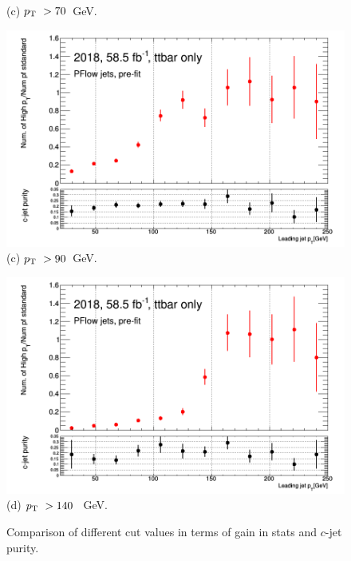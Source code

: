 \documentclass[letterpaper,12pt]{article}
\begin{document}
\begin{figure}[!h]
\begin{minipage}[b]{.45\textwidth}
\footnotesize (c) $p_{\mathrm T}\ > 70$~GeV.
\end{minipage}\hfill
\begin{minipage}[b]{.45\textwidth}
\centering
\includegraphics[width=1\textwidth]{stat_gains/statsgain_90GeV.png}
\footnotesize (c) $\pt\ > 90$~GeV.
\end{minipage}\hfill
\centering
\begin{minipage}[b]{.45\textwidth}
\centering
\includegraphics[width=1\textwidth]{stat_gains/statsgain_140GeV.png}
\footnotesize (d) $\pt\ > 140$~ GeV.
\end{minipage}\hfill

\caption{Comparison of different cut values in terms of gain in stats and $c$-jet purity.}
\label{fig:cutvalue}
\end{figure}
\end{document}
